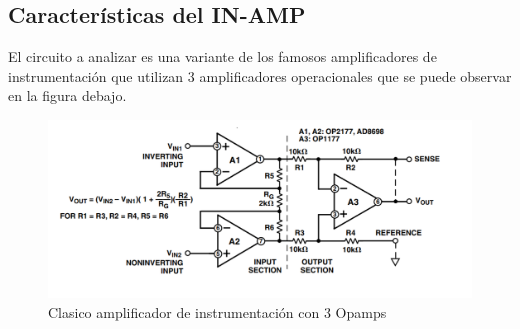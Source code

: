 \documentclass[a4paper]{article}
\begin{document}
	\subsection{Características del IN-AMP}
	El circuito a analizar es una variante de los famosos amplificadores de instrumentación que utilizan 3 amplificadores operacionales que se puede observar en la figura debajo.
	\begin{figure}[H]
		\centering
		\includegraphics[width=\linewidth]{../ImagenesVarias/inAmp3Opamp}
		\caption{Clasico amplificador de instrumentación con 3 Opamps}
	\end{figure}
		
\end{document}
